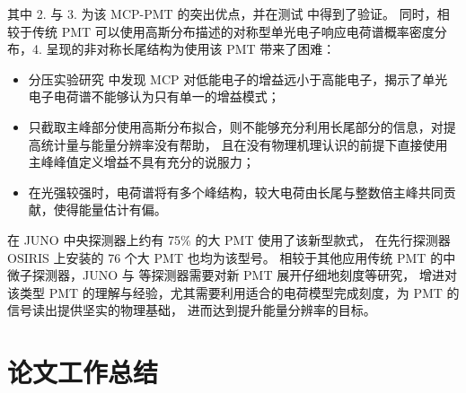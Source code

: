 其中 2. 与 3. 为该 MCP-PMT 的突出优点，并在测试\cite{zhangPerformanceEvaluation8inch2023} 中得到了验证。
同时，相较于传统 PMT 可以使用高斯分布描述的对称型单光电子响应电荷谱概率密度分布，4. 呈现的非对称长尾结构为使用该 PMT 带来了困难：
\begin{itemize}
    \item 分压实验研究\cite{yangMCPPerformanceImprovement2017} 中发现 MCP 对低能电子的增益远小于高能电子，揭示了单光电子电荷谱不能够认为只有单一的增益模式；
    \item 只截取主峰部分使用高斯分布拟合，则不能够充分利用长尾部分的信息，对提高统计量与能量分辨率没有帮助，
    且在没有物理机理认识的前提下直接使用主峰峰值定义增益不具有充分的说服力；
    \item 在光强较强时，电荷谱将有多个峰结构，较大电荷由长尾与整数倍主峰共同贡献，使得能量估计有偏。
\end{itemize}

在 JUNO 中央探测器上约有 75\% 的大 PMT 使用了该新型款式，
在先行探测器 OSIRIS 上安装的 76 个大 PMT 也均为该型号。
相较于其他应用传统 PMT 的中微子探测器，JUNO 与 等探测器需要对新 PMT 展开仔细地刻度等研究，
增进对该类型 PMT 的理解与经验，尤其需要利用适合的电荷模型完成刻度，为 PMT 的信号读出提供坚实的物理基础，
进而达到提升能量分辨率的目标。

\section{论文工作总结}
